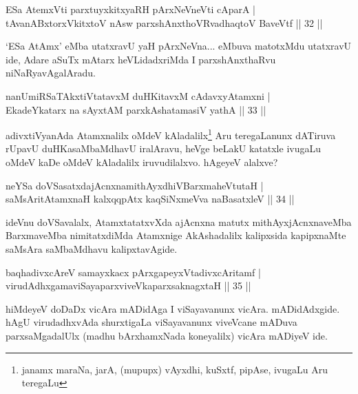 
\begin{shl}
ESa AtemxVti parxtuyxkitxyaRH pArxNeVneVti cAparA |\\
tAvanABxtorxVkitxtoV nAsw parxshAnxthoVR\s vadhaqtoV BaveVtf \hfill || 32 ||
\end{shl}

\begin{artha}
`ESa AtAmx' eMba utatxravU yaH pArxNeVna... eMbuva matotxMdu utatxravU ide, Adare aSuTx mAtarx heVLidadxriMda I parxshAnxthaRvu niNaRyavAgalAradu.
\end{artha}


\begin{shl}
nanUmiRSaTAkxtiVtatavxM duHKitavxM cAdavxyAtamxni |\\
EkadeYkatarx na sAyxtAM parxkAshatamasiV yathA \hfill || 33 ||
\end{shl}

\begin{artha}
adivxtiVyanAda Atamxnalilx oMdeV kAladalilx\footnote[1]{janamx maraNa, jarA, (mupupx) vAyxdhi, kuSxtf, pipAse, ivugaLu Aru teregaLu}  Aru teregaLanunx dATiruva rUpavU duHKasaMbaMdhavU iralAravu, heVge beLakU katatxle ivugaLu oMdeV kaDe oMdeV kAladalilx iruvudilalxvo. hAgeyeV alalxve? 
\end{artha}


\begin{shl}
neYSa doVSasatxdajAcnxnamithAyxdhiVBarxmaheVtutaH |\\
saMsAritA\s \s tamxnaH kalxqqpAtx kaqSiNxmeVva naBasatxleV \hfill || 34 ||
\end{shl}

\begin{artha}%
ideVnu doVSavalalx, AtamxtatatxvXda ajAcnxna matutx mithAyxjAcnxnaveMba BarxmaveMba nimitatxdiMda Atamxnige AkAshadalilx kalipxsida kapipxnaMte saMsAra saMbaMdhavu kalipxtavAgide.
\end{artha}

\begin{shl}
baqhadivxcAreV samayxkacx pArxgapeyxVtadivxcAritamf |\\
virudAdhxgamaviSayaparxviveVkaparxsaknagxtaH \hfill || 35 ||
\end{shl}

\begin{artha}
hiMdeyeV doDaDx vicAra mADidAga I viSayavanunx vicAra. mADidAdxgide. hAgU virudadhxvAda shurxtigaLa viSayavanunx viveVcane mADuva parxsaMgadalUlx (madhu bArxhamxNada koneyalilx) vicAra mADiyeV ide.
\end{artha}

